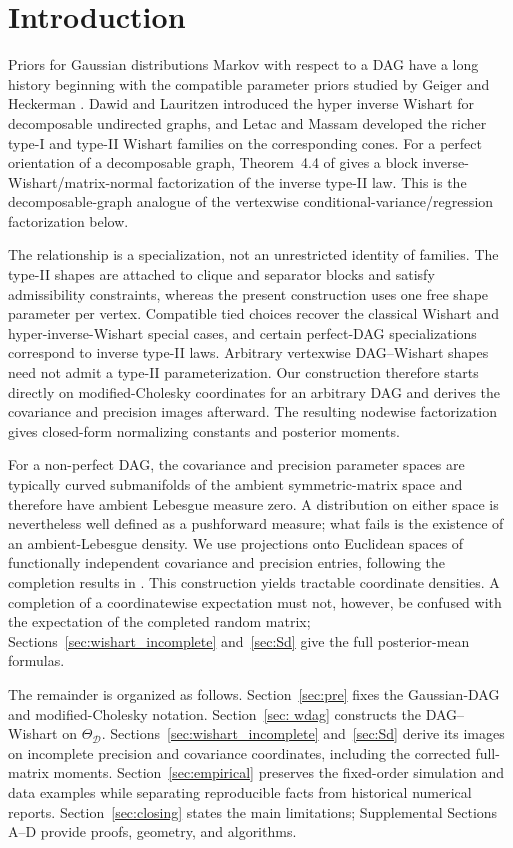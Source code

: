 \documentclass[12pt]{article}
\newcommand{\D}{\mathcal{D}}
\theoremstyle{plain}
\theoremstyle{definition}
\theoremstyle{remark}
\begin{document}
\section{Introduction}\label{sec:intro}
Priors for Gaussian distributions Markov with respect to a DAG have a
long history beginning with the compatible parameter priors studied by
Geiger and Heckerman \cite{Geiger1994,Heckerman02}.  Dawid and Lauritzen
\cite{dawid93*} introduced the hyper inverse Wishart for decomposable
undirected graphs, and Letac and Massam \cite{letac07*} developed the
richer type-I and type-II Wishart families on the corresponding cones.
For a perfect orientation of a decomposable graph, Theorem~4.4 of
\cite{letac07*} gives a block inverse-Wishart/matrix-normal factorization
of the inverse type-II law.  This is the decomposable-graph analogue of
the vertexwise conditional-variance/regression factorization below.

The relationship is a specialization, not an unrestricted identity of
families.  The type-II shapes are attached to clique and separator blocks
and satisfy admissibility constraints, whereas the present construction
uses one free shape parameter per vertex.  Compatible tied choices recover
the classical Wishart and hyper-inverse-Wishart special cases, and certain
perfect-DAG specializations correspond to inverse type-II laws.  Arbitrary
vertexwise DAG--Wishart shapes need not admit a type-II parameterization.
Our construction therefore starts directly on modified-Cholesky
coordinates for an arbitrary DAG and derives the covariance and precision
images afterward.  The resulting nodewise factorization gives closed-form
normalizing constants and posterior moments.

For a non-perfect DAG, the covariance and precision parameter spaces are
typically curved submanifolds of the ambient symmetric-matrix space and
therefore have ambient Lebesgue measure zero.  A distribution on either
space is nevertheless well defined as a pushforward measure; what fails
is the existence of an ambient-Lebesgue density.  We use projections
onto Euclidean spaces of functionally independent covariance and
precision entries, following the completion results in
\cite{benraj12}.  This construction yields tractable coordinate
densities.  A completion of a coordinatewise expectation must not,
however, be confused with the expectation of the completed random
matrix; Sections~\ref{sec:wishart_incomplete} and~\ref{sec:Sd} give the
full posterior-mean formulas.

The remainder is organized as follows.  Section~\ref{sec:pre} fixes the
Gaussian-DAG and modified-Cholesky notation.  Section~\ref{sec: wdag}
constructs the DAG--Wishart on $\Theta_{\D}$.
Sections~\ref{sec:wishart_incomplete} and~\ref{sec:Sd} derive its images on
incomplete precision and covariance coordinates, including the corrected
full-matrix moments.  Section~\ref{sec:empirical} preserves the fixed-order
simulation and data examples while separating reproducible facts from
historical numerical reports.  Section~\ref{sec:closing} states the main
limitations; Supplemental Sections A--D provide proofs, geometry, and
algorithms.
\end{document}
